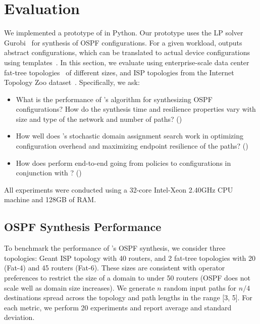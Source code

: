 \section{Evaluation}
 \label{sec:evaluation}
 
 We implemented a prototype of \name in Python. Our prototype uses the
 LP solver Gurobi~\cite{gurobi} for synthesis of OSPF configurations.
 For a given workload, \name outputs abstract configurations, which
 can be translated to actual device configurations using
 templates~\cite{template}.  In this section, we evaluate \Name using
enterprise-scale data
center fat-tree topologies~\cite{fattree} of different 
sizes, and ISP topologies from the Internet Topology Zoo 
dataset~\cite{zoo}.  
Specifically, we ask:
\begin{itemize}
	\item What is the performance of \Name's algorithm for
          synthesizing OSPF configurations? How do the synthesis time
          and resilience properties vary with size and type of the
          network and number of paths? ()
	
	\item How well does \name's stochastic domain assignment 
	search work in optimizing configuration overhead
	and maximizing endpoint resilience of the paths? ()
	
	\item How does \name perform end-to-end going from policies to
          configurations in conjunction with \genesis?
          ()
\end{itemize}
All experiments were conducted using a
32-core Intel-Xeon 2.40GHz CPU machine and
128GB of RAM.

\subsection{OSPF Synthesis Performance}\label{sec:ospfeval}
To benchmark the performance of \name's OSPF synthesis,
we consider three topologies: Geant ISP topology with 40 routers,
and 2 fat-tree topologies with 20 (Fat-4) and 45 routers (Fat-6). 
These sizes are consistent with operator preferences to restrict
the size of a domain to under 50 routers (OSPF does not scale
well as domain size increases). We generate $n$ random input paths for
$n/4$ destinations spread across the topology and path
lengths in the range [3, 5]. For each metric, we perform 20 experiments
and report average and standard deviation. 

